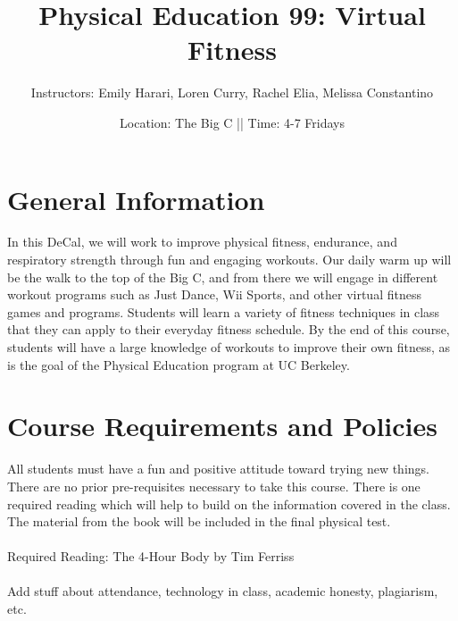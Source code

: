 \documentclass[letterpaper,12pt]{article}
\begin{document}
\title{Physical Education 99: Virtual Fitness}
\date{Location: The Big C || Time: 4-7 Fridays }
\author{Instructors: Emily Harari, Loren Curry, Rachel Elia, Melissa Constantino}
\maketitle

\section{General Information}



In this DeCal, we will work to improve physical fitness, endurance, and respiratory strength through fun and engaging workouts. Our daily warm up will be the walk to the top of the Big C, and from there we will engage in different workout programs such as Just Dance, Wii Sports, and other virtual fitness games and programs. Students will learn a variety of fitness techniques in class that they can apply to their everyday fitness schedule. By the end of this course, students will have a large knowledge of workouts to improve their own fitness, as is the goal of the Physical Education program at UC Berkeley.




\section{Course Requirements and Policies}

All students must have a fun and positive attitude toward trying new things. There are no prior pre-requisites necessary to take this course. There is one required reading which will help to build on the information covered in the class. The material from the book will be included in the final physical test.\\
\\
Required Reading: The 4-Hour Body by Tim Ferriss \\
\\
Add stuff about attendance, technology in class, academic honesty, plagiarism, etc.
\end{document}
